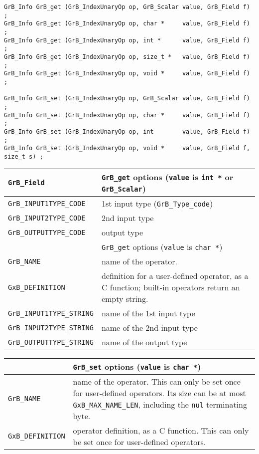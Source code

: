 \begin{mdframed}[userdefinedwidth=6in]
{\footnotesize
\begin{verbatim}
GrB_Info GrB_get (GrB_IndexUnaryOp op, GrB_Scalar value, GrB_Field f) ;
GrB_Info GrB_get (GrB_IndexUnaryOp op, char *     value, GrB_Field f) ;
GrB_Info GrB_get (GrB_IndexUnaryOp op, int *      value, GrB_Field f) ;
GrB_Info GrB_get (GrB_IndexUnaryOp op, size_t *   value, GrB_Field f) ;
GrB_Info GrB_get (GrB_IndexUnaryOp op, void *     value, GrB_Field f) ;

GrB_Info GrB_set (GrB_IndexUnaryOp op, GrB_Scalar value, GrB_Field f) ;
GrB_Info GrB_set (GrB_IndexUnaryOp op, char *     value, GrB_Field f) ;
GrB_Info GrB_set (GrB_IndexUnaryOp op, int        value, GrB_Field f) ;
GrB_Info GrB_set (GrB_IndexUnaryOp op, void *     value, GrB_Field f, size_t s) ;
\end{verbatim}
}\end{mdframed}

\noindent
{\small
\begin{tabular}{p{2.2in}p{3.5in}}
\hline
\hline
\verb'GrB_Field'                    & \verb'GrB_get' options (\verb'value' is \verb'int *' or \verb'GrB_Scalar') \\
\hline
\verb'GrB_INPUT1TYPE_CODE'          & 1st input type (\verb'GrB_Type_code') \\
\verb'GrB_INPUT2TYPE_CODE'          & 2nd input type \\
\verb'GrB_OUTPUTTYPE_CODE'          & output type \\
\hline
\hline
                                    & \verb'GrB_get' options (\verb'value' is \verb'char *') \\
\hline
\verb'GrB_NAME'                     & name of the operator. \\
\verb'GxB_DEFINITION'               & definition for a user-defined operator, as a C function; built-in operators
                                        return an empty string. \\
\verb'GrB_INPUT1TYPE_STRING'        & name of the 1st input type \\
\verb'GrB_INPUT2TYPE_STRING'        & name of the 2nd input type \\
\verb'GrB_OUTPUTTYPE_STRING'        & name of the output type \\
\hline
\end{tabular}
}

\noindent
{\small
\begin{tabular}{p{2.2in}p{3.5in}}
\hline
                                    & \verb'GrB_set' options (\verb'value' is \verb'char *') \\
\hline
\verb'GrB_NAME'                     & name of the operator.  This can only be set once for user-defined operators.
                                        Its size can be at most \verb'GxB_MAX_NAME_LEN', including the
                                        \verb'nul' terminating byte. \\
\verb'GxB_DEFINITION'               & operator definition, as a C function.  This can only be
                                        set once for user-defined operators. \\
\hline
\end{tabular}
}

